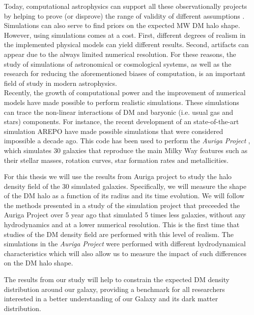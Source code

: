 \documentclass[12pt]{article}
\begin{document}
Today, computational astrophysics can support all these observationally projects by helping to prove (or disprove) the range of validity of different assumptions \cite{prove,bardeen,Vera-Ciro2011}.
Simulations can also serve to find priors on the expected MW DM halo shape.
However, using simulations comes at a cost.
First, different degrees of realism in the implemented physical models can yield different results.
Second, artifacts can appear due to the always limited numerical resolution. 
For these reasons, the study of simulations of astronomical or cosmological systems, as well as the research for reducing the aforementioned biases of computation, is an important field of study in modern astrophysics.\\

Recently, the growth of computational power and the improvement of numerical models have made possible to perform realistic simulations.
These simulations can trace the non-linear interactions of DM and baryonic (i.e. usual gas and stars) components. 
For instance, the recent development of an state-of-the-art simulation AREPO \cite{arepo} have made possible simulations that were considered impossible a decade ago.
This code has been used to perform the \emph{Auriga Project} \cite{auriga}, which simulates 30 galaxies that reproduce the main Milky Way features such as their stellar masses, rotation curves, star formation rates and metallicities.

For this thesis we will use the results from Auriga project \cite{auriga} to study the halo density field of the 30 simulated galaxies.
Specifically, we will measure the shape of the DM halo as a function of its radius and its time evolution.
We will follow the methods presented in a study of the simulation project that preceeded the Auriga Project over 5 year ago \cite{Vera-Ciro2011} that simulated 5 times less galaxies, without any hydrodynamics and at a lower numerical resolution. 
This is the first time that studies of the DM density field are performed with this level of realism.
The simulations in the \emph{Auriga Project} were performed with different hydrodynamical characteristics 
which will also allow us to measure the impact of such differences on the DM halo shape.

The results from our study will help to constrain the expected DM density distribution around our galaxy, 
providing a benchmark for all researchers interested in a better understanding of our Galaxy and its 
dark matter distribution.
\end{document}
